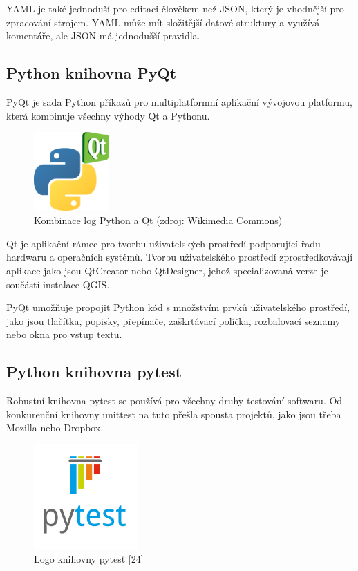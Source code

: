\documentclass[a4paper,oneside,12pt]{book}
\begin{document}
\hspace{10mm}YAML je také jednoduší pro editaci člověkem než JSON, který je vhodnější pro zpracování strojem. YAML může mít složitější datové struktury a využívá komentáře, ale JSON má jednodušší pravidla. \cite{hsOq0virmVAO85Ud}


\subsection{Python knihovna PyQt} \label{pyqt}
\hspace{10mm}PyQt je sada Python příkazů pro multiplatformní aplikační vývojovou platformu, která kombinuje všechny výhody Qt a Pythonu.  \cite{Summerfield2007}

\begin{figure}[H] \label{obr8}
\centering
\includegraphics[height=3cm]{pictures/Python_and_Qt.png}
\caption{Kombinace log Python a Qt  (zdroj: Wikimedia Commons)}
\label{fig:qt}
\end{figure}

\hspace{10mm}Qt je aplikační rámec pro tvorbu uživatelských prostředí podporující řadu hardwaru a operačních systémů. Tvorbu uživatelského prostředí zprostředkovávají aplikace jako jsou QtCreator nebo QtDesigner, jehož specializovaná verze je součástí instalace QGIS.

\hspace{10mm}PyQt umožňuje propojit Python kód s množstvím prvků uživatelského prostředí, jako jsou tlačítka, popisky, přepínače, zaškrtávací políčka, rozbalovací seznamy nebo okna pro vstup textu.

\subsection{Python knihovna pytest} \label{pytest}
\hspace{10mm}Robustní knihovna pytest se používá pro všechny druhy testování softwaru. Od konkurenční knihovny unittest na tuto přešla spousta projektů, jako jsou třeba Mozilla nebo Dropbox. \cite{Okken2017}

\begin{figure}[ht] \label{obr9}
\centering
\includegraphics[height=4cm]{pictures/Pytest_logo.png}
\caption{Logo knihovny pytest [24]}
\label{fig:pytest}
\end{figure}
\end{document}
